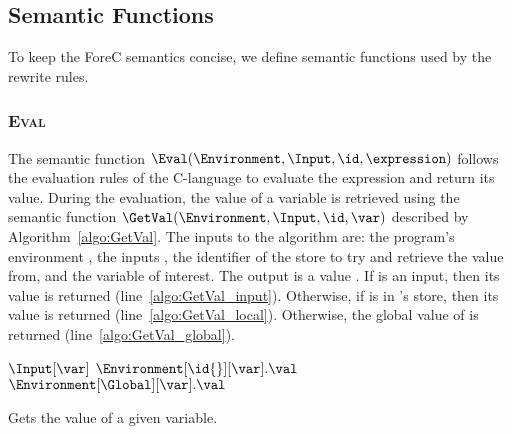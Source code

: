 \subsection{Semantic Functions}
To keep the ForeC semantics concise, we define semantic functions 
used by the rewrite rules.

\subsubsection{\textsc{Eval}}
\label{sec:forec_Eval}
The semantic function $\Eval(\Environment, \Input, \id, \expression)$ 
follows the evaluation rules of the C-language to 
evaluate the expression \expression{} and return 
its value. During the evaluation, the value of a 
variable is retrieved using the semantic function $\GetVal(\Environment, \Input, \id, \var)$ 
described by Algorithm~\ref{algo:GetVal}. 
The inputs to the algorithm are: the program's environment 
\Environment{}, the inputs \Input{}, the identifier \id{} of the
store to try and retrieve the value from, and the variable \var{} of interest. The 
output is a value \val{}. If \var{} is an input, 
then its value is returned (line~\ref{algo:GetVal_input}). 
Otherwise, if \var{} is in \id{}'s store, then its value is returned 
(line~\ref{algo:GetVal_local}). 
Otherwise, the global value of \var{} is returned
(line~\ref{algo:GetVal_global}).

\begin{algorithm}[t]
	\begin{algorithmic}[1]
		\Function{$\GetVal$}{\Environment{}, \Input{}, \id{}, \var{}}
			\If {$\var \in \Input$}
				\State \Return $\Input[\var]$								\label{algo:GetVal_input}
			\ElsIf {$\var \in \Environment[\id{}]$}	
					\State \Return $\Environment[\id{}][\var].\val$			\label{algo:GetVal_local}
			\Else
				\State \Return $\Environment[\Global][\var].\val$			\label{algo:GetVal_global}
			\EndIf
		\EndFunction
	\end{algorithmic}
	
	\caption{Gets the value of a given variable.}
	\label{algo:GetVal}
\end{algorithm}

